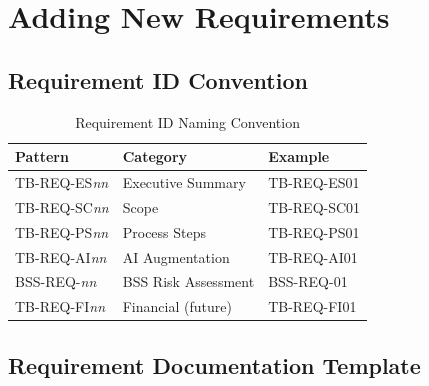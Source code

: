 \documentclass[11pt,a4paper,twoside]{report}
\begin{document}
\section{Adding New Requirements}
\label{sec:adding-requirements}

\subsection{Requirement ID Convention}

\begin{table}[h]
\centering
\caption{Requirement ID Naming Convention}
\begin{tabularx}{\textwidth}{@{}L{3.5cm}L{4cm}L{6cm}@{}}
\toprule
\textbf{Pattern} & \textbf{Category} & \textbf{Example} \\
\midrule
TB-REQ-ES\textit{nn} & Executive Summary & TB-REQ-ES01 \\
TB-REQ-SC\textit{nn} & Scope & TB-REQ-SC01 \\
TB-REQ-PS\textit{nn} & Process Steps & TB-REQ-PS01 \\
TB-REQ-AI\textit{nn} & AI Augmentation & TB-REQ-AI01 \\
BSS-REQ-\textit{nn} & BSS Risk Assessment & BSS-REQ-01 \\
TB-REQ-FI\textit{nn} & Financial (future) & TB-REQ-FI01 \\
\bottomrule
\end{tabularx}
\end{table}

\subsection{Requirement Documentation Template}
\end{document}
